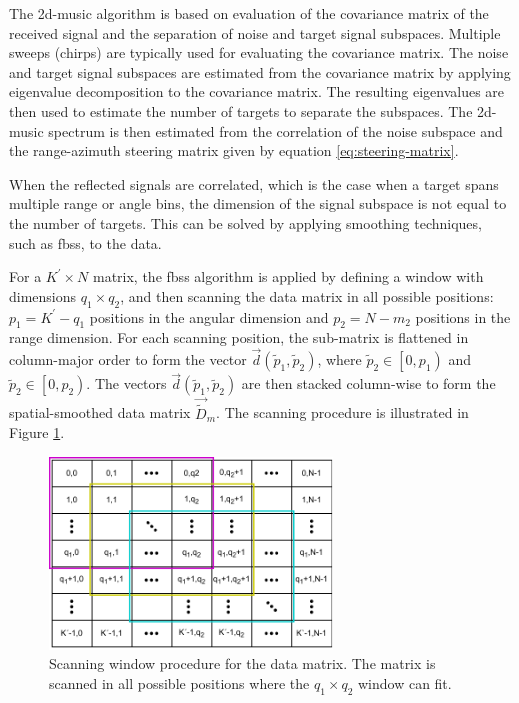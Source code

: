 The \gls{2d-music} algorithm is based on evaluation of the covariance matrix of the received signal and the separation of noise and target signal subspaces.
Multiple sweeps (chirps) are typically used for evaluating the covariance matrix.
The noise and target signal subspaces are estimated from the covariance matrix by applying eigenvalue decomposition to the covariance matrix.
The resulting eigenvalues are then used to estimate the number of targets to separate the subspaces.
The \gls{2d-music} spectrum is then estimated from the correlation of the noise subspace
and the range-azimuth steering matrix given by equation \ref{eq:steering-matrix}. \cite{2d-music-van-rossum}

When the reflected signals are correlated, which is the case when a target spans multiple range or angle bins,
the dimension of the signal subspace is not equal to the number of targets.
This can be solved by applying smoothing techniques, such as \gls{fbss}, to the data. \cite{2d-music-van-rossum, fbss-techniques}

For a $K^{\prime} \times N$ matrix, the \gls{fbss} algorithm is applied by defining a window with dimensions $q_1 \times q_2$,
and then scanning the data matrix in all possible positions: 
$p_1 = K^{\prime} - q_1$ positions in the angular dimension and $p_2 = N - m_2$ positions in the range dimension.
For each scanning position, the sub-matrix is flattened in column-major order to form the vector $\vec{d}(\tilde{p}_1, \tilde{p}_2)$,
where $\tilde{p}_2 \in \left[ 0, p_1 \right)$ and $\tilde{p}_2 \in \left[ 0, p_2 \right) $.
The vectors $\vec{d}(\tilde{p}_1, \tilde{p}_2)$ are then stacked column-wise to form the spatial-smoothed data matrix $\vec{\tilde{D}}_m$.
The scanning procedure is illustrated in Figure \ref{fig:data-matrix-scanning}. \cite{2d-music-van-rossum, music-based-algo}

\begin{figure}[H]
    \centering
    \includegraphics[width=0.67\textwidth]{fig/4/array-scanning.pdf}
    \caption{Scanning window procedure for the data matrix. The matrix is scanned in all possible positions where the $q_1 \times q_2$ window can fit.}
    \label{fig:data-matrix-scanning}
\end{figure}

